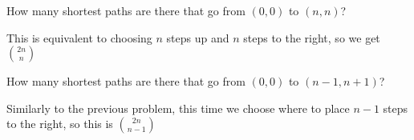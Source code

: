 \documentclass[11pt]{article}
\begin{document}
{\color{blue}{The shortest path that exists is a path where we only either go up or to the right, since if we ever move either left or down, then we'd have to retrace our steps at some point, thus generating a longer path.}}
\begin{Parts}

\Part How many shortest paths are there that go from $(0,0)$ to $(n,n)$?

\begin{solution}
  This is equivalent to choosing $n$ steps up and $n$ steps to the right, so we get $2n \choose n$
\end{solution}

\Part How many shortest paths are there that go from $(0,0)$ to $(n-1,n+1)$?

\begin{solution}
  Similarly to the previous problem, this time we choose where to place $n-1$ steps to the right, so this is $2n \choose {n-1}$
\end{solution}

\end{Parts}
\end{document}
